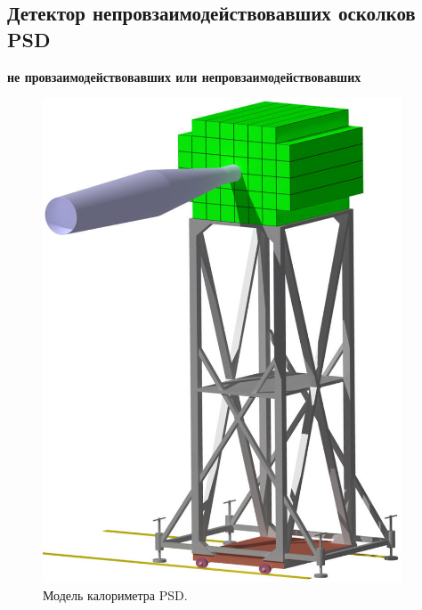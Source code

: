 
\subsection{Детектор непровзаимодействовавших осколков PSD}\label{sec:secPSD}

\todo \textbf{не провзаимодействовавших или непровзаимодействовавших} \todo

\todo
\todo

\begin{minipage}[t]{0.495\textwidth}
\begin{figure}[H]
\includegraphics[width=0.95\textwidth]{pictures/CBM_PSD_model.png}
\caption{Модель калориметра PSD.}
\label{fig:PSD}
\end{figure}
\end{minipage}
